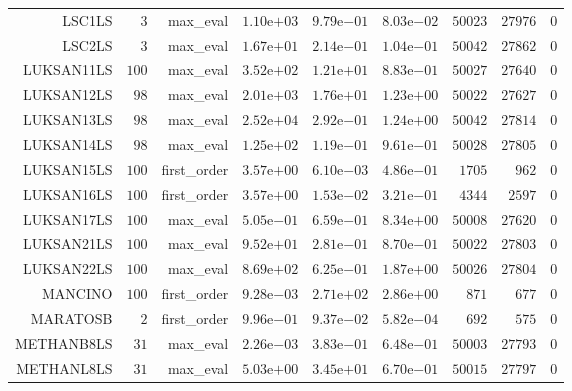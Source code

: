 \begin{longtable}{rrrrrrrrr}
LSC1LS & \(     3\) & max\_eval & \( 1.10\)e\(+03\) & \( 9.79\)e\(-01\) & \( 8.03\)e\(-02\) & \( 50023\) & \( 27976\) & \(     0\) \\
LSC2LS & \(     3\) & max\_eval & \( 1.67\)e\(+01\) & \( 2.14\)e\(-01\) & \( 1.04\)e\(-01\) & \( 50042\) & \( 27862\) & \(     0\) \\
LUKSAN11LS & \(   100\) & max\_eval & \( 3.52\)e\(+02\) & \( 1.21\)e\(+01\) & \( 8.83\)e\(-01\) & \( 50027\) & \( 27640\) & \(     0\) \\
LUKSAN12LS & \(    98\) & max\_eval & \( 2.01\)e\(+03\) & \( 1.76\)e\(+01\) & \( 1.23\)e\(+00\) & \( 50022\) & \( 27627\) & \(     0\) \\
LUKSAN13LS & \(    98\) & max\_eval & \( 2.52\)e\(+04\) & \( 2.92\)e\(-01\) & \( 1.24\)e\(+00\) & \( 50042\) & \( 27814\) & \(     0\) \\
LUKSAN14LS & \(    98\) & max\_eval & \( 1.25\)e\(+02\) & \( 1.19\)e\(-01\) & \( 9.61\)e\(-01\) & \( 50028\) & \( 27805\) & \(     0\) \\
LUKSAN15LS & \(   100\) & first\_order & \( 3.57\)e\(+00\) & \( 6.10\)e\(-03\) & \( 4.86\)e\(-01\) & \(  1705\) & \(   962\) & \(     0\) \\
LUKSAN16LS & \(   100\) & first\_order & \( 3.57\)e\(+00\) & \( 1.53\)e\(-02\) & \( 3.21\)e\(-01\) & \(  4344\) & \(  2597\) & \(     0\) \\
LUKSAN17LS & \(   100\) & max\_eval & \( 5.05\)e\(-01\) & \( 6.59\)e\(-01\) & \( 8.34\)e\(+00\) & \( 50008\) & \( 27620\) & \(     0\) \\
LUKSAN21LS & \(   100\) & max\_eval & \( 9.52\)e\(+01\) & \( 2.81\)e\(-01\) & \( 8.70\)e\(-01\) & \( 50022\) & \( 27803\) & \(     0\) \\
LUKSAN22LS & \(   100\) & max\_eval & \( 8.69\)e\(+02\) & \( 6.25\)e\(-01\) & \( 1.87\)e\(+00\) & \( 50026\) & \( 27804\) & \(     0\) \\
MANCINO & \(   100\) & first\_order & \( 9.28\)e\(-03\) & \( 2.71\)e\(+02\) & \( 2.86\)e\(+00\) & \(   871\) & \(   677\) & \(     0\) \\
MARATOSB & \(     2\) & first\_order & \( 9.96\)e\(-01\) & \( 9.37\)e\(-02\) & \( 5.82\)e\(-04\) & \(   692\) & \(   575\) & \(     0\) \\
METHANB8LS & \(    31\) & max\_eval & \( 2.26\)e\(-03\) & \( 3.83\)e\(-01\) & \( 6.48\)e\(-01\) & \( 50003\) & \( 27793\) & \(     0\) \\
METHANL8LS & \(    31\) & max\_eval & \( 5.03\)e\(+00\) & \( 3.45\)e\(+01\) & \( 6.70\)e\(-01\) & \( 50015\) & \( 27797\) & \(     0\) \\

\end{longtable}
